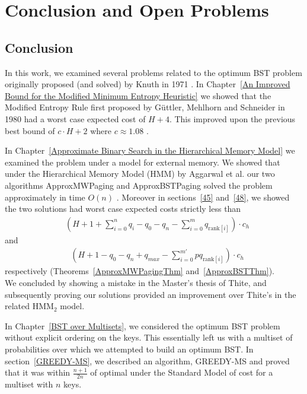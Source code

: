 \documentclass[letterpaper,12pt,titlepage,oneside,final]{book}
\theoremstyle{plain}
\begin{document}



\chapter{Conclusion and Open Problems} \label{Conclusion and Open Problems}

\section{Conclusion}

In this work, we examined several problems related to the optimum BST problem originally proposed (and solved) by Knuth in 1971 \cite{knuth1971optimum}. In Chapter~\ref{An Improved Bound for the Modified Minimum Entropy Heuristic} we showed that the Modified Entropy Rule first proposed by  G{\"u}ttler, Mehlhorn and Schneider in 1980 had a worst case expected cost of $H+4$. This improved upon the previous best bound of $c\cdot H+2$ where $c \approx 1.08$ \cite{guttler1980binary}.

In Chapter~\ref{Approximate Binary Search in the Hierarchical Memory Model} we examined the problem under a model for external memory. We showed that under the Hierarchical Memory Model (HMM) by Aggarwal et al. our two algorithms ApproxMWPaging and ApproxBSTPaging solved the problem approximately in time $O(n)$ \cite{aggarwal1987model}. Moreover in sections~\ref{45} and~\ref{48}, we showed the two solutions had worst case expected costs strictly less than
\begin{align*}
&(H + 1 + \sum_{i=0}^n q_i - q_0 - q_n - \sum_{i=0}^m q_{\text{rank}[i]}) \cdot  c_h
\end{align*}
and
\begin{align*}
&(H + 1 - q_0 - q_n + q_{max} - \sum_{i=0}^{m'} pq_{\text{rank}[i]})\cdot c_h
\end{align*}
respectively  (Theorems~\ref{ApproxMWPagingThm} and~\ref{ApproxBSTThm}). \\

   We concluded by showing a mistake in the Master's thesis of Thite, and subsequently proving our solutions provided an improvement over Thite's in the related HMM$_2$ model.

In Chapter~\ref{BST over Multisets}, we considered the optimum BST problem without explicit ordering on the keys. This essentially left us with a multiset of probabilities over which we attempted to build an optimum BST. In section~\ref{GREEDY-MS}, we described an algorithm, GREEDY-MS and proved that it was within $\frac{n+1}{2n}$ of optimal under the Standard Model of cost for a multiset with $n$ keys.
\end{document}
